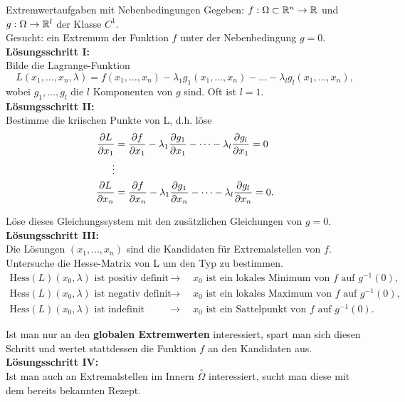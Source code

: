 \begin{Rezept}{Extremwertaufgaben mit Nebenbedingungen}{}
	Gegeben: $f:\Omega\subset \mathbb{R}^n \to \mathbb{R}$ und $g:\Omega \to \mathbb{R}^l$ der Klasse $C^1$.\\
	Gesucht: ein Extremum der Funktion $f$ unter der Nebenbedingung $g=0$.\\
	\newline
	\textbf{Lösungsschritt I:}\\
	Bilde die Lagrange-Funktion
	\begin{equation*}
	L(x_1,\dots,x_n,\lambda) = f(x_1,\dots,x_n) - \lambda_1 g_1(x_1,\dots,x_n) - \dots - \lambda_l g_l(x_1,\dots,x_n),
	\end{equation*}
	wobei $g_1,\dots,g_l$ die $l$ Komponenten von $g$ sind. Oft ist $l=1$.\\
	\newline
	\textbf{Lösungsschritt II:}\\
	Bestimme die kriischen Punkte von L, d.h. löse
	\begin{align*}
	\pdv{L}{x_1} &= \pdv{f}{x_1}-\lambda_1\pdv{g_1}{x_1} - \dots -\lambda_l\pdv{g_l}{x_1} = 0\\
	\vdots\\
	\pdv{L}{x_n} &= \pdv{f}{x_n}-\lambda_1\pdv{g_1}{x_n} - \dots -\lambda_l\pdv{g_l}{x_n} = 0.
	\end{align*}
	
	Löse dieses Gleichungssystem mit den zusätzlichen Gleichungen von $g=0$.\\
	\newline
	\textbf{Lösungsschritt III:}\\
	Die Lösungen $(x_1,\dots,x_n)$ sind die Kandidaten für Extremalstellen von $f$. Untersuche die Hesse-Matrix von L um den Typ zu bestimmen.
	\begin{align*}
	\text{Hess}(L)(x_0,\lambda)\text{ ist positiv definit} \quad &\rightarrow  \quad 
	x_0 \text{ ist ein lokales Minimum von } f \text{ auf } g^{-1}(0),\\
	\text{Hess}(L)(x_0,\lambda)\text{ ist negativ definit} \quad &\rightarrow  \quad x_0 \text{ ist ein lokales Maximum von } f \text{ auf } g^{-1}(0),\\
	\text{Hess}(L)(x_0,\lambda)\text{ ist indefinit} \quad &\rightarrow  \quad x_0 \text{ ist ein Sattelpunkt von } f \text{ auf } g^{-1}(0).
	\end{align*}
	
	Ist man nur an den \textbf{globalen Extremwerten} interessiert, spart man sich diesen Schritt und wertet stattdessen die Funktion $f$ an den Kandidaten aus.\\
	\newline
	\textbf{Lösungsschritt IV:}\\
	Ist man auch an Extremalstellen im Innern $\overset{\circ}{\Omega}$ interessiert, sucht man diese mit dem bereits bekannten Rezept.
\end{Rezept}
